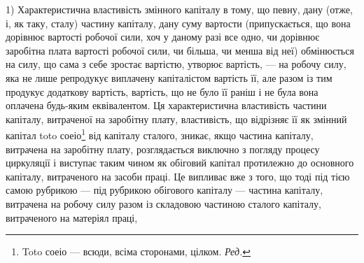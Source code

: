 1) Характеристична властивість змінного капіталу в тому, що певну,
дану (отже, і, як таку, сталу) частину капіталу, дану суму вартости
(припускається, що вона дорівнює вартості робочої сили, хоч у даному
разі все одно, чи дорівнює заробітна плата вартості робочої сили, чи
більша, чи менша від неї) обмінюється на силу, що сама з себе
зростає вартістю, утворює вартість, — на робочу силу, яка не лише репродукує
виплачену капіталістом вартість її, але разом із тим продукує
додаткову вартість, вартість, що не було її раніш і не була вона
оплачена будь-яким еквівалентом. Ця характеристична властивість частини
капіталу, витраченої на заробітну плату, властивість, що відрізняє її як
змінний капітал toto соеіо\footnote*{
Toto соеіо — всюди, всіма сторонами, цілком. \emph{Ред.}
} від капіталу сталого, зникає, якщо частина
капіталу, витрачена на заробітну плату, розглядається виключно з погляду
процесу циркуляції і виступає таким чином як обіговий капітал
протилежно до основного капіталу, витраченого на засоби праці. Це
випливає вже з того, що тоді під тією самою рубрикою — під рубрикою
обігового капіталу — частина капіталу, витрачена на робочу силу разом із
складовою частиною сталого капіталу, витраченого на матеріял праці,
\parbreak{}  %
